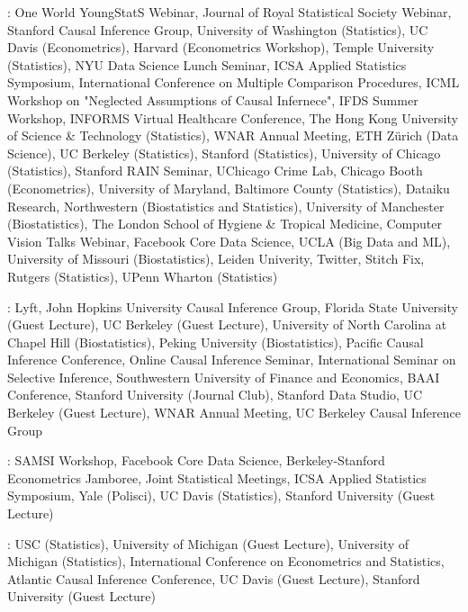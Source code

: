 \documentclass{article}
\begin{document}
\vspace{4mm}
: One World YoungStatS Webinar, Journal of Royal Statistical Society Webinar, Stanford Causal Inference Group, University of Washington (Statistics), UC Davis (Econometrics), Harvard (Econometrics Workshop), Temple University (Statistics), NYU Data Science Lunch Seminar, ICSA Applied Statistics Symposium, International Conference on Multiple Comparison Procedures, ICML Workshop on "Neglected Assumptions of Causal Infernece", IFDS Summer Workshop, INFORMS Virtual Healthcare Conference, The Hong Kong University of Science \& Technology (Statistics), WNAR Annual Meeting, ETH Z\"{u}rich (Data Science), UC Berkeley (Statistics), Stanford (Statistics), University of Chicago (Statistics), Stanford RAIN Seminar, UChicago Crime Lab, Chicago Booth (Econometrics), University of Maryland, Baltimore County (Statistics), Dataiku Research, Northwestern (Biostatistics and Statistics), University of Manchester (Biostatistics), The London School of Hygiene \& Tropical Medicine, Computer Vision Talks Webinar, Facebook Core Data Science, UCLA (Big Data and ML), University of Missouri (Biostatistics), Leiden Univerity, Twitter, Stitch Fix, Rutgers (Statistics), UPenn Wharton (Statistics)

\vspace{4mm}
:
Lyft, John Hopkins University Causal Inference Group, Florida State University (Guest Lecture), UC Berkeley (Guest Lecture), University of North Carolina at Chapel Hill (Biostatistics), Peking University (Biostatistics), Pacific Causal Inference Conference, Online Causal Inference Seminar, International Seminar on Selective Inference, Southwestern University of Finance and Economics, BAAI Conference, Stanford University (Journal Club), Stanford Data Studio, UC Berkeley (Guest Lecture), WNAR Annual Meeting, UC Berkeley Causal Inference Group

\vspace{4mm}
: SAMSI Workshop, Facebook Core Data Science, Berkeley-Stanford Econometrics Jamboree, Joint Statistical Meetings, ICSA Applied Statistics Symposium, Yale (Polisci), UC Davis (Statistics), Stanford University (Guest Lecture)

\vspace{4mm}
: USC (Statistics), University of Michigan (Guest Lecture), University of Michigan (Statistics), International Conference on Econometrics and Statistics, Atlantic Causal Inference Conference, UC Davis (Guest Lecture), Stanford University (Guest Lecture)
\end{document}
